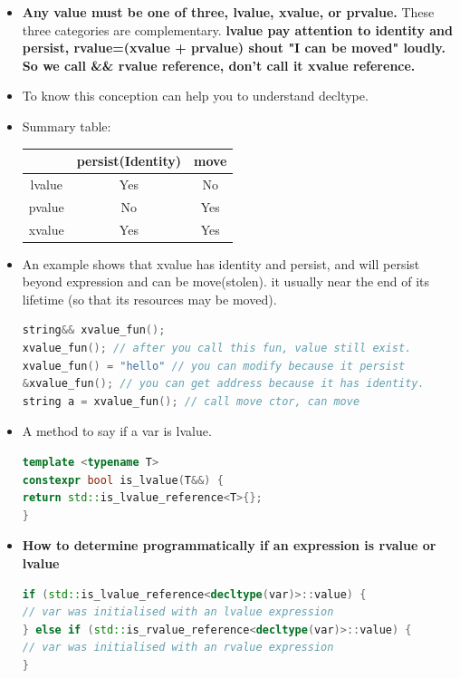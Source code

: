 \documentclass[a4paper,12pt,twoside]{book}
\begin{document}
\begin{itemize}
	\item \textbf{Any value must be one of three, lvalue, xvalue, or prvalue.} These three categories are complementary.  \textbf{lvalue pay attention to  identity and persist, rvalue=(xvalue + prvalue) shout "I can be moved" loudly.  So we call \&\& rvalue reference, don't call it xvalue reference. }
	
	\item To know this conception can help you to understand decltype. 
	
	\item Summary table: \newline
	\begin{tabular}{|c|c|c|}
		\hline
		& persist(Identity) & move \\
		\hline
		lvalue & Yes & No \\
		\hline
		pvalue & No & Yes \\
		\hline
		xvalue & Yes & Yes \\
		\hline
	\end{tabular}

\item An example shows that xvalue has identity and persist, and will persist beyond expression and can be move(stolen). it usually near the end of its lifetime (so that its resources may be moved).
\begin{lstlisting}[frame=single, language=c++, mathescape=true]
string&& xvalue_fun();
xvalue_fun(); // after you call this fun, value still exist.
xvalue_fun() = "hello" // you can modify because it persist
&xvalue_fun(); // you can get address because it has identity.
string a = xvalue_fun(); // call move ctor, can move
\end{lstlisting}

\item A method to say if a var is lvalue.
\begin{lstlisting}[frame=single, language=c++]
template <typename T>
constexpr bool is_lvalue(T&&) {
return std::is_lvalue_reference<T>{};
}
\end{lstlisting}

\item \textbf{How to determine programmatically if an expression is rvalue or lvalue}
\begin{lstlisting}[frame=single, language=c++]
if (std::is_lvalue_reference<decltype(var)>::value) {
// var was initialised with an lvalue expression
} else if (std::is_rvalue_reference<decltype(var)>::value) {
// var was initialised with an rvalue expression
}
\end{lstlisting}

\end{itemize}
\end{document}
